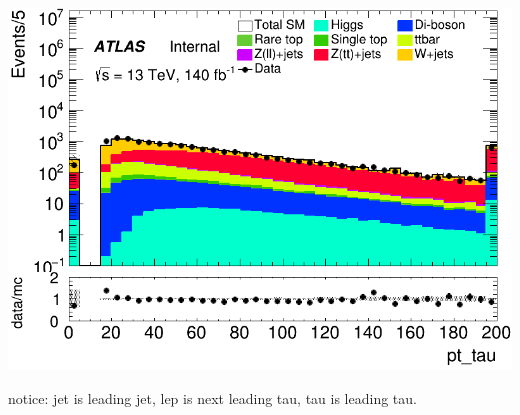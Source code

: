 \documentclass[usenames,dvipsnames]{beamer}
\begin{document}
\begin{frame}
\begin{minipage}{0.32\textwidth}
        \includegraphics[width=\textwidth]{graphics/HH_met/HH_met_pt_tau.png}
    \end{minipage}
    
    \vspace{0.5cm} %
    notice: jet is leading jet, lep is next leading tau, tau is leading tau.
\end{frame}
\end{document}
